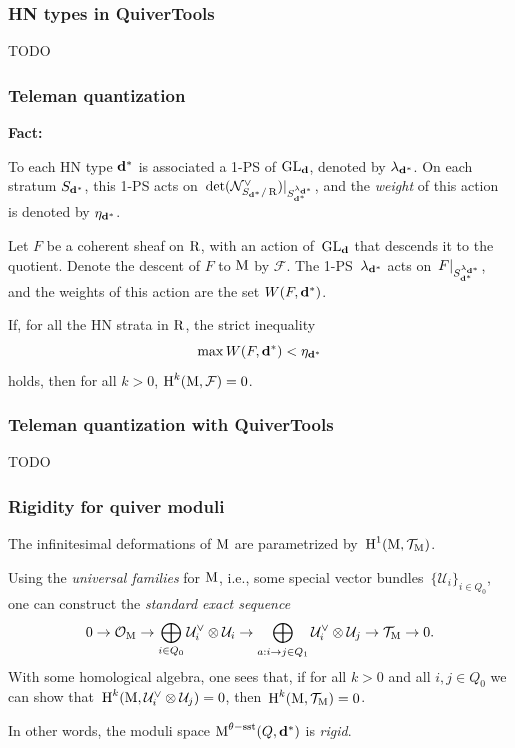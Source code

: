 \documentclass{beamer}
\begin{document}
\begin{frame}
    \frametitle{HN types in QuiverTools}
TODO
\end{frame}

\begin{frame}
    \frametitle{Teleman quantization}
\textbf{Fact:}

To each HN type $\mathbf{d}^*$ is associated a 1-PS of $\operatorname{GL}_{\mathbf{d}}$,
denoted by $\lambda_{\mathbf{d}^*}$.
On each stratum $S_{\mathbf{d}^*}$, this 1-PS acts
on~$\det(\mathcal{N}^{\vee}_{S_{\mathbf{d}^*}/\operatorname{R}})|_{S_{\mathbf{d}^*}^{\lambda_{\mathbf{d}^*}}}$,
and the \emph{weight} of this action is denoted by $\eta_{\mathbf{d}^*}$. \pause

Let $F$ be a coherent sheaf on $\operatorname{R}$, with an action of~$\operatorname{GL}_{\mathbf{d}}$
that descends it to the quotient.
Denote the descent of $F$ to $\operatorname{M}$ by $\mathcal{F}$. \pause
The 1-PS~$\lambda_{\mathbf{d}^*}$ acts on~$F|_{S_{\mathbf{d}^*}^{\lambda_{\mathbf{d}^*}}}$,
and the weights of this action are the set $W(F, \mathbf{d}^*)$. \pause

\begin{theorem}
If, for all the HN strata in $\operatorname{R}$, the strict inequality
\[\max W(F, \mathbf{d}^*) < \eta_{\mathbf{d}^*}\]
holds, then for all $k > 0$, $\operatorname{H}^k(\operatorname{M}, \mathcal{F}) = 0$.
\end{theorem}
\end{frame}

\begin{frame}
    \frametitle{Teleman quantization with QuiverTools}
TODO
\end{frame}

\begin{frame}
    \frametitle{Rigidity for quiver moduli}
The infinitesimal deformations of $\operatorname{M}$ are parametrized
by~$\operatorname{H}^1(\operatorname{M}, \mathcal{T}_{\operatorname{M}})$. \pause

Using the \emph{universal families} for $\operatorname{M}$, i.e.,
some special vector bundles~$\{\mathcal{U}_i\}_{i \in Q_0}$,
one can construct the \emph{standard exact sequence}
\begin{equation}\label{equation:4-term-exact-sequence}
0
\overset{}{\rightarrow}\mathcal{O}_{\operatorname{M}}
\overset{}{\rightarrow}\bigoplus_{i \in Q_0} \mathcal{U}^\vee_i \otimes \mathcal{U}_i
\overset{}{\rightarrow}\bigoplus_{a: i \overset{}{\rightarrow} j \in Q_1} \mathcal{U}^\vee_{i} \otimes \mathcal{U}_{j}
\overset{}{\rightarrow}\mathcal{T}_{\operatorname{M}}
\overset{}{\rightarrow} 0.
\end{equation} \pause
With some homological algebra, one sees that, if for all $k > 0$ and all $i,j \in Q_0$
we can show that~$\operatorname{H}^k(\operatorname{M}, \mathcal{U}^{\vee}_i \otimes \mathcal{U}_j) = 0$,
then~$\operatorname{H}^k(\operatorname{M}, \mathcal{T}_{\operatorname{M}}) = 0$. \pause

In other words, the moduli space $\operatorname{M}^{\theta-\mathrm{sst}}(Q, \mathbf{d}^*)$
is \emph{rigid}.
\end{frame}
\end{document}
